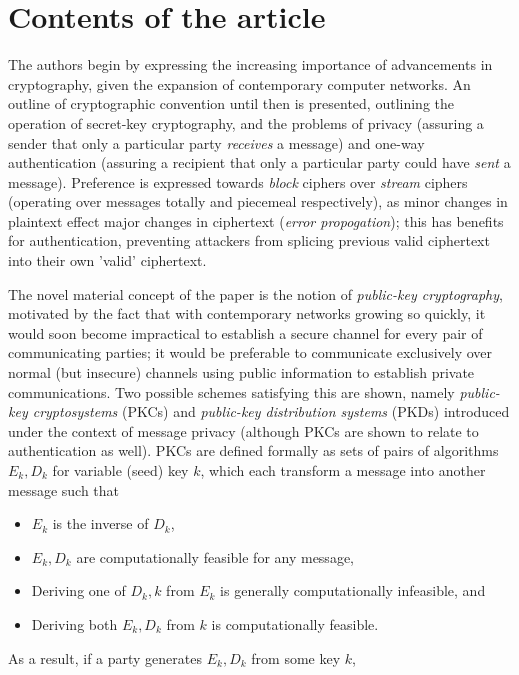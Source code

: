 \documentclass[11pt]{article}
\begin{document}
\section{Contents of the article}

The authors begin by expressing the increasing importance of advancements in
cryptography, given the expansion of contemporary computer networks. An outline
of cryptographic convention until then is presented, outlining the operation of
secret-key cryptography, and the problems of privacy (assuring a sender that
only a particular party \textit{receives} a message) and one-way authentication
(assuring a recipient that only a particular party could have \textit{sent} a
message). Preference is expressed towards \textit{block} ciphers over
\textit{stream} ciphers (operating over messages totally and piecemeal
respectively), as minor changes in plaintext effect major changes in ciphertext
(\textit{error propogation}); this has benefits for authentication, preventing
attackers from splicing previous valid ciphertext into their own 'valid'
ciphertext.
\par
The novel material concept of the paper is the notion of \textit{public-key
cryptography}, motivated by the fact that with contemporary networks growing so
quickly, it would soon become impractical to establish a secure channel for
every pair of communicating parties; it would be preferable to communicate
exclusively over normal (but insecure) channels using public information to
establish private communications. Two possible schemes satisfying this are
shown, namely \textit{public-key cryptosystems} (PKCs) and \textit{public-key
distribution systems} (PKDs) introduced under the context of message privacy
(although PKCs are shown to relate to authentication as well). PKCs are defined
formally as sets of pairs of algorithms \( E_k, D_k \) for variable (seed) key
\( k \), which each transform a message into another message such
that
\begin{itemize}[noitemsep, nolistsep]
    \item \( E_k \) is the inverse of \( D_k \),
    \item \( E_k, D_k \) are computationally feasible for any message,
    \item Deriving one of \( D_k, k \) from \( E_k \) is generally
        computationally infeasible, and
    \item Deriving both \( E_k, D_k \) from \( k \) is computationally feasible.
\end{itemize}
As a result, if a party generates \( E_k, D_k \) from some key \( k \), 
\end{document}
